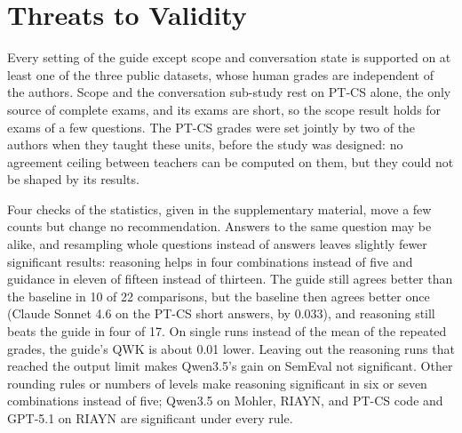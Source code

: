 
\section{Threats to Validity}
\label{sec:threats}

Every setting of the guide except scope and conversation state is supported on at least one of the three
public datasets, whose human grades are independent of the authors. Scope and the conversation sub-study rest on
PT-CS alone, the only source of complete exams, and its exams are short, so the scope result holds for exams of a
few questions. The PT-CS grades were set jointly by two of the authors when they taught these units, before the
study was designed: no agreement ceiling between teachers can be computed on them, but they could not be shaped
by its results.

Four checks of the statistics, given in the supplementary material, move a few counts but change no
recommendation. Answers to the same question may be alike, and resampling whole questions instead of answers
leaves slightly fewer significant results: reasoning helps in four combinations instead of five and guidance in eleven of fifteen instead of thirteen.
The guide still agrees better than the baseline in 10 of 22 comparisons, but the baseline then agrees better once
(Claude Sonnet 4.6 on the PT-CS short answers, by 0.033), and reasoning still beats the guide in four of 17. On single runs instead of the mean of the repeated grades, the guide's QWK is about 0.01
lower. Leaving out the reasoning runs that reached the output limit makes Qwen3.5's gain on SemEval not
significant. Other rounding rules or numbers of levels make reasoning significant in six or seven combinations
instead of five; Qwen3.5 on Mohler, RIAYN, and PT-CS code and GPT-5.1 on RIAYN are significant under every rule.

